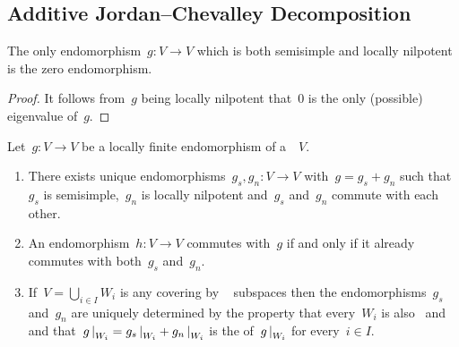 \subsection{Additive Jordan--Chevalley Decomposition}


\begin{lemma}
  \label{ss and locally np is zero}
  The only endomorphism~$g \colon V \to V$ which is both semisimple and locally nilpotent is the zero endomorphism.
\end{lemma}


\begin{proof}
  It follows from~$g$ being locally nilpotent that~$0$ is the only (possible) eigenvalue of~$g$.
\end{proof}


\begin{proposition}
  \label{local jcd}
  Let~$g \colon V \to V$ be a locally finite endomorphism of a~~$V$.
  \begin{enumerate}
    \item
      \label{the local jcd itself}
      There exists unique endomorphisms~$g_s, g_n \colon V \to V$ with~$g = g_s + g_n$ such that~$g_s$ is semisimple,~$g_n$ is locally nilpotent and~$g_s$ and~$g_n$ commute with each other.
    \item
      \label{commuting via local jcd}
      An endomorphism~$h \colon V \to V$ commutes with~$g$ if and only if it already commutes with both~$g_s$ and~$g_n$.
    \item
      \label{local jcd via cover}
      If~$V = \bigcup_{i \in I} W_i$ is any covering by ~ subspaces then the endomorphisms~$g_s$ and~$g_n$ are uniquely determined by the property that every~$W_i$ is also~ and~ and that~$\restrict{g}{W_i} = \restrict{g_s}{W_i} + \restrict{g_n}{W_i}$ is the {\JCD} of~$\restrict{g}{W_i}$ for every~$i \in I$.
  \end{enumerate}
\end{proposition}


